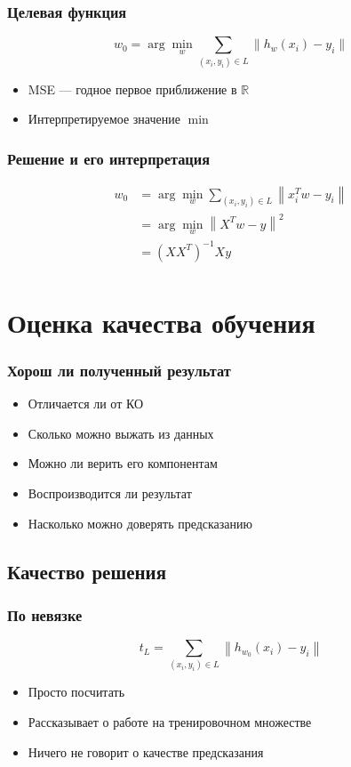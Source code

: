 \documentclass[14pt, fleqn, xcolor={dvipsnames, table}]{beamer}
\begin{document}
\begin{frame}[t]\frametitle{Целевая функция}
    $$
      w_0 = \arg\min_w \sum_{(x_i,y_i) \in L} \| h_w(x_i) - y_i \|
    $$
\begin{itemize}
  \item MSE --- годное первое приближение в $\mathbb{R}$
  \item Интерпретируемое значение $\min$
\end{itemize}
\end{frame}

\begin{frame}[t]\frametitle{Решение и его интерпретация}
    $$
      \begin{array}{ll}
      w_0 &= \arg\min_w \sum_{(x_i,y_i) \in L} \left\| x_i^Tw - y_i \right\| \\
       &= \arg\min_w \left\|X^Tw - y\right\|^2 \\
      &= \left(XX^T\right)^{-1}Xy \\
      \end{array}
    $$
\end{frame}

\section{Оценка качества обучения}
\begin{frame}[t]\frametitle{Хорош ли полученный результат}
\begin{itemize}
  \item Отличается ли от КО
  \item Сколько можно выжать из данных
  \item Можно ли верить его компонентам
  \item Воспроизводится ли результат
  \item Насколько можно доверять предсказанию
\end{itemize}
\end{frame}

\subsection{Качество решения}
\begin{frame}[t]\frametitle{По невязке}
$$
t_L = \sum_{(x_i,y_i) \in L} \left\| h_{w_0}(x_i) - y_i \right\|
$$
\begin{itemize}
  \item Просто посчитать
  \item Рассказывает о работе на тренировочном множестве
  \item Ничего не говорит о качестве предсказания
\end{itemize}
\end{frame}
\end{document}
